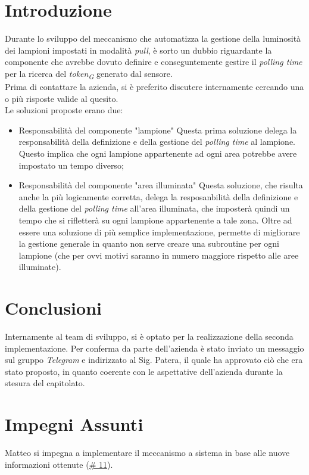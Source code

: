 \documentclass[a4paper, 12pt]{article}
\begin{document}
\section*{Introduzione}
Durante lo sviluppo del meccanismo che automatizza la gestione della luminosità dei lampioni impostati in modalità \textit{pull}, è sorto un dubbio riguardante la componente che avrebbe dovuto definire e conseguntemente gestire il \textit{polling time} per la ricerca del \textit{token\textsubscript{G}} generato dal sensore.\\
Prima di contattare la azienda, si è preferito discutere internamente cercando una o più risposte valide al quesito.\\
Le soluzioni proposte erano due:
\begin{itemize}
    \item Responsabilità del componente "lampione"
          \subitem Questa prima soluzione delega la responsabilità della definizione e della gestione del \textit{polling time} al lampione. Questo implica che ogni lampione appartenente ad ogni area potrebbe avere impostato un tempo diverso;
    \item Responsabilità del componente "area illuminata"
          \subitem Questa soluzione, che risulta anche la più logicamente corretta, delega la resposanbilità della definizione e della gestione del \textit{polling time} all'area illuminata, che imposterà quindi un tempo che si rifletterà su ogni lampione appartenente a tale zona. Oltre ad essere una soluzione di più semplice implementazione, permette di migliorare la gestione generale in quanto non serve creare una subroutine per ogni lampione (che per ovvi motivi saranno in numero maggiore rispetto alle aree illuminate).
\end{itemize}

\section*{Conclusioni}
Internamente al team di sviluppo, si è optato per la realizzazione della seconda implementazione. Per conferma da parte dell'azienda è stato inviato un messaggio sul gruppo \textit{Telegram} e indirizzato al Sig. Patera, il quale ha approvato ciò che era stato proposto, in quanto coerente con le aspettative dell'azienda durante la stesura del capitolato.

\section*{Impegni Assunti}
Matteo si impegna a implementare il meccanismo a sistema in base alle nuove informazioni ottenute (\href{https://github.com/4ourSquared/LumosMinima-code/issues/11}{\# 11}).
\end{document}
